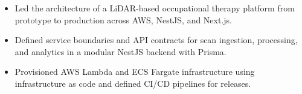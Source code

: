 \begin{itemize}
  \item Led the architecture of a LiDAR-based occupational therapy platform from prototype to production across AWS, NestJS, and Next.js.
  \item Defined service boundaries and API contracts for scan ingestion, processing, and analytics in a modular NestJS backend with Prisma.
  \item Provisioned AWS Lambda and ECS Fargate infrastructure using infrastructure as code and defined CI/CD pipelines for releases.
\end{itemize}
